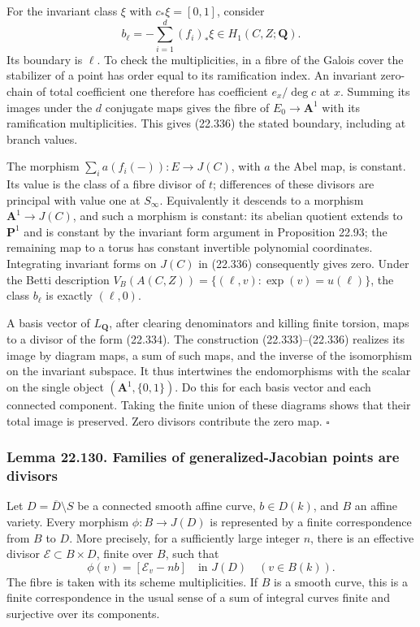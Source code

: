 \documentclass[
  11pt,
  a4paper,
]{article}
\begin{document}
For the invariant class \(\xi\) with \(c_*\xi=[0,1]\), consider \[
 b_\ell=-\sum_{i=1}^d(f_i)_*\xi\in H_1(C,Z;\mathbf Q).
 \tag{22.336}
\] Its boundary is \(\ell\). To check the multiplicities, in a fibre of
the Galois cover the stabilizer of a point has order equal to its
ramification index. An invariant zero-chain of total coefficient one
therefore has coefficient \(e_x/\deg c\) at \(x\). Summing its images
under the \(d\) conjugate maps gives the fibre of \(E_0\to\mathbf A^1\)
with its ramification multiplicities. This gives (22.336) the stated
boundary, including at branch values.

The morphism \(\sum_i a(f_i(-)):E\to J(C)\), with \(a\) the Abel map, is
constant. Its value is the class of a fibre divisor of \(t\);
differences of these divisors are principal with value one at
\(S_\infty\). Equivalently it descends to a morphism
\(\mathbf A^1\to J(C)\), and such a morphism is constant: its abelian
quotient extends to \(\mathbf P^1\) and is constant by the invariant
form argument in Proposition 22.93; the remaining map to a torus has
constant invertible polynomial coordinates. Integrating invariant forms
on \(J(C)\) in (22.336) consequently gives zero. Under the Betti
description \(V_B(A(C,Z))=\{(\ell,v):\exp(v)=u(\ell)\}\), the class
\(b_\ell\) is exactly \((\ell,0)\).

A basis vector of \(L_{\mathbf Q}\), after clearing denominators and
killing finite torsion, maps to a divisor of the form (22.334). The
construction (22.333)--(22.336) realizes its image by diagram maps, a
sum of such maps, and the inverse of the isomorphism on the invariant
subspace. It thus intertwines the endomorphisms with the scalar on the
single object \((\mathbf A^1,\{0,1\})\). Do this for each basis vector
and each connected component. Taking the finite union of these diagrams
shows that their total image is preserved. Zero divisors contribute the
zero map. \(\square\)

\subsubsection{Lemma 22.130. Families of generalized-Jacobian points are
divisors}\label{lemma-22.130.-families-of-generalized-jacobian-points-are-divisors}

Let \(D=\overline D\setminus S\) be a connected smooth affine curve,
\(b\in D(k)\), and \(B\) an affine variety. Every morphism
\(\phi:B\to J(D)\) is represented by a finite correspondence from \(B\)
to \(D\). More precisely, for a sufficiently large integer \(n\), there
is an effective divisor \(\mathcal E\subset B\times D\), finite over
\(B\), such that \[
 \phi(v)=[\mathcal E_v-nb]\quad\text{in }J(D)
 \quad(v\in B(k)).
 \tag{22.337}
\] The fibre is taken with its scheme multiplicities. If \(B\) is a
smooth curve, this is a finite correspondence in the usual sense of a
sum of integral curves finite and surjective over its components.
\end{document}
